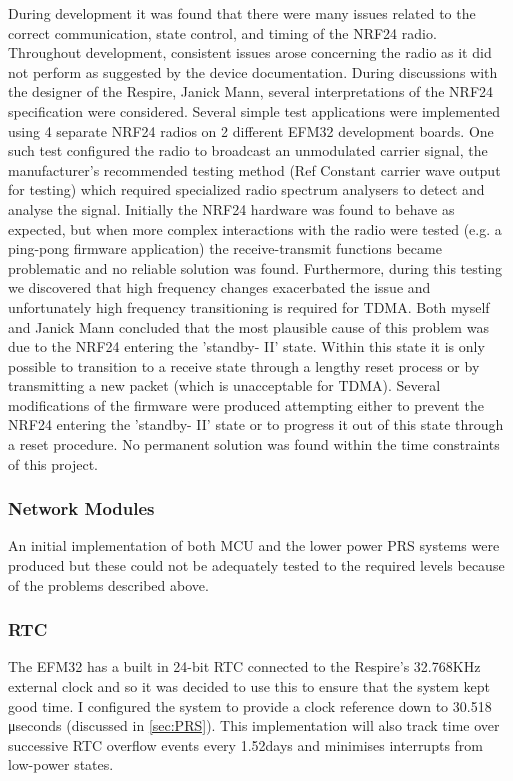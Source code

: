 During development it was found that there were many issues related to the correct
communication, state control, and timing of the \ac{NRF24} radio. Throughout development, consistent
issues arose concerning the radio as it did not perform as suggested by the device documentation.
During discussions with the designer of the Respire, Janick Mann, several interpretations of the
NRF24 specification were considered. Several simple test applications were implemented using 4
separate \ac{NRF24} radios on 2 different EFM32 development boards. One such test configured the
radio to broadcast an unmodulated carrier signal, the manufacturer's recommended testing method
(Ref Constant carrier wave output for testing) which required specialized radio spectrum analysers
to detect and analyse the signal. Initially the \ac{NRF24} hardware was found to behave as expected, but
when more complex interactions with the radio were tested (e.g. a ping-pong firmware application)
the receive-transmit functions became problematic and no reliable solution was found.
Furthermore, during this testing we discovered that high frequency changes exacerbated the issue
and unfortunately high frequency transitioning is required for \ac{TDMA}. Both myself and Janick Mann
concluded that the most plausible cause of this problem was due to the \ac{NRF24} entering the
'standby- II' state. Within this state it is only possible to transition to a receive state through a
lengthy reset process or by transmitting a new packet (which is unacceptable for \ac{TDMA}). Several
modifications of the firmware were produced attempting either to prevent the \ac{NRF24} entering the
'standby- II' state or to progress it out of this state through a reset procedure. No permanent
solution was found within the time constraints of this project.


\subsubsection{Network Modules}
An initial implementation of both \ac{MCU} and the lower power \ac{PRS} systems were produced but these
could not be adequately tested to the required levels because of the problems described above.


\subsubsection{\acf{RTC}}
The EFM32 has a built in 24-bit \ac{RTC} connected to the Respire's 32.768KHz external
clock and so it was decided to use this to ensure that the system kept good time. I configured the
system to provide a clock reference down to 30.518 μseconds (discussed in \ref{sec:PRS}). This
implementation will also track time over successive RTC overflow events every 1.52days and
minimises interrupts from low-power states.


